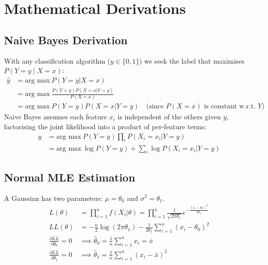 \documentclass{article}
\begin{document}
\newpage
\section{Mathematical Derivations}
\label{app:derivations}

\subsection*{Naive Bayes Derivation}
With any classification algorithm ($y \in \{0,1\}$) we seek the label that maximises $P(Y = y \mid X = x)$:
\begin{equation}
\begin{aligned}
\hat y &= \text{arg max} \ P(Y = y | X = x) \\
&= \text{arg max} \ \frac{P(Y = y)P(X = x | Y = y)}{P(X = x)} \\
&= \text{arg max} \ P(Y = y)P(X = x | Y = y) \quad \text{(since $P(X=x)$ is constant w.r.t.\ $Y$)}
\end{aligned}
\end{equation}
Naive Bayes assumes each feature $x_i$ is independent of the others given $y$, factorising the joint likelihood into a product of per-feature terms:
\begin{equation}
\begin{aligned}
\hat y &= \text{arg max} \ P(Y = y)\prod_i P(X_i = x_i | Y = y) \\
&= \text{arg max} \ \log P(Y = y) + \sum_i \log P(X_i = x_i | Y = y)
\end{aligned}
\end{equation}

\subsection*{Normal MLE Estimation}
A Gaussian has two parameters: $\mu = \theta_0$ and $\sigma^2 = \theta_1$.
\begin{equation}
\begin{aligned}
L(\theta) &= \prod_{i=1}^n f(X_i|\theta)
= \prod_{i=1}^n \frac{1}{\sqrt{2\pi\theta_1}}e^{-\frac{(x_i-\theta_0)^2}{2\theta_1}} \\
LL(\theta) &= -\frac{n}{2}\log(2\pi\theta_1) - \frac{1}{2\theta_1}\sum_{i=1}^n(x_i - \theta_0)^2 \\
\frac{\partial LL}{\partial \theta_0} = 0 &\implies \hat{\theta}_0 = \frac{1}{n}\sum_{i=1}^n x_i = \bar{x} \\
\frac{\partial LL}{\partial \theta_1} = 0 &\implies \hat{\theta}_1 = \frac{1}{n}\sum_{i=1}^n(x_i - \bar{x})^2
\end{aligned}
\end{equation}
\end{document}
